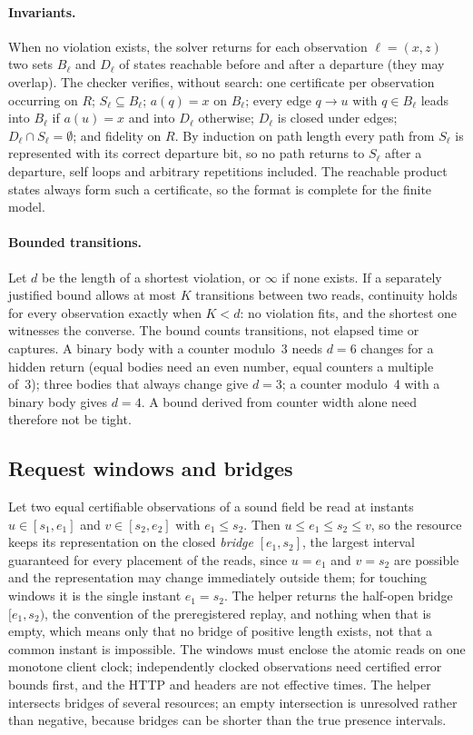 \paragraph{Invariants.} When no violation exists, the solver returns for each
observation $\ell=(x,z)$ two sets $B_\ell$ and $D_\ell$ of states reachable
before and after a departure (they may overlap). The checker verifies, without
search: one certificate per observation occurring on $R$; $S_\ell\subseteq
B_\ell$; $a(q)=x$ on $B_\ell$; every edge $q\to u$ with $q\in B_\ell$ leads into
$B_\ell$ if $a(u)=x$ and into $D_\ell$ otherwise; $D_\ell$ is closed under
edges; $D_\ell\cap S_\ell=\emptyset$; and fidelity on $R$. By induction on
path length every path from $S_\ell$ is represented with its correct
departure bit, so no path returns to $S_\ell$ after a departure, self loops
and arbitrary repetitions included. The reachable product states always form
such a certificate, so the format is complete for the finite model.

\paragraph{Bounded transitions.} Let $d$ be the length of a shortest
violation, or $\infty$ if none exists. If a separately justified bound allows
at most $K$ transitions between two reads, continuity holds for every
observation exactly when $K<d$: no violation fits, and the shortest one
witnesses the converse. The bound counts transitions, not elapsed time or
captures. A binary body with a counter modulo~3 needs $d=6$ changes for a
hidden return (equal bodies need an even number, equal counters a multiple
of~3); three bodies that always change give $d=3$; a counter modulo~4 with a
binary body gives $d=4$. A bound derived from counter width alone need
therefore not be tight.

\subsection{Request windows and bridges}
Let two equal certifiable observations of a sound field be read at instants
$u\in[s_1,e_1]$ and $v\in[s_2,e_2]$ with $e_1\le s_2$. Then $u\le e_1\le s_2\le v$, so the resource
keeps its representation on the closed \emph{bridge} $[e_1,s_2]$, the largest
interval guaranteed for every placement of the reads, since $u=e_1$ and $v=s_2$
are possible and the representation may change immediately outside them; for
touching windows it is the single instant $e_1=s_2$. The helper
 returns the half-open bridge $[e_1,s_2)$, the
convention of the preregistered replay, and nothing when that is empty, which
means only that no bridge of positive length exists, not that a common instant
is impossible.
The windows must enclose the atomic reads on one monotone client clock;
independently clocked observations need certified error bounds first, and the
HTTP  and  headers are not effective times. The
helper  intersects bridges of several resources; an empty
intersection is unresolved rather than negative, because bridges can be
shorter than the true presence intervals.

